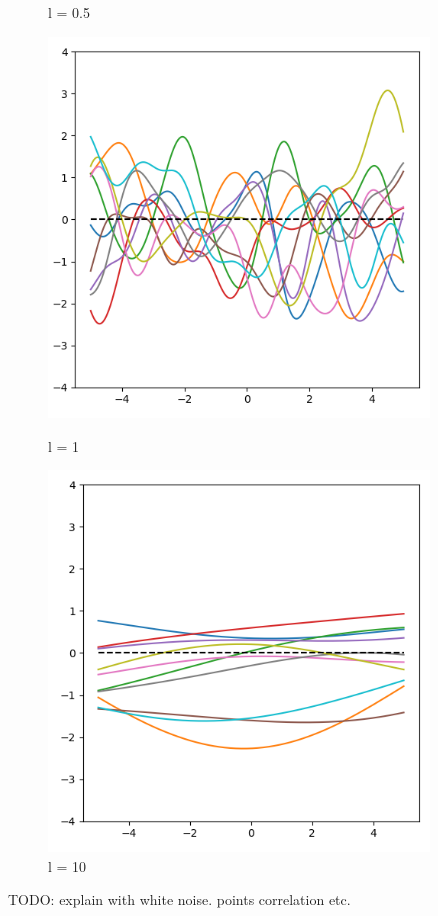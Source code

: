 \documentclass[12pt]{article}
\newenvironment{question}[2][Question]{\begin{trivlist}
\kern10pt
\item[\hskip \labelsep {\bfseries #1}\hskip \labelsep {\bfseries #2.}]}{\end{trivlist}}
\begin{document}
\begin{question}{10}
\begin{figure}[h]
\begin{minipage}{0.45\textwidth}
      \caption{l = 0.5}
  \end{minipage}
\end{figure}
\begin{figure}[h]
  \centering
  \begin{minipage}{0.45\textwidth}
      \centering
      \includegraphics[width=0.9\textwidth]{fig/Q10-l100.png} 
      \caption{l = 1}
  \end{minipage}\hfill
  \begin{minipage}{0.45\textwidth}
      \centering
      \includegraphics[width=0.9\textwidth]{fig/Q10-l1000.png}
      \caption{l = 10}
  \end{minipage}
\end{figure}

TODO: explain with white noise. points correlation etc.
\end{question}
\end{document}
